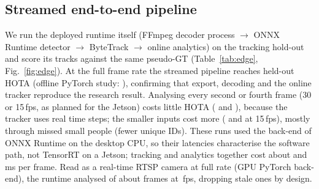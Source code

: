\documentclass[conference]{IEEEtran}
\begin{document}
\subsection{Streamed end-to-end pipeline}
We run the deployed runtime itself (FFmpeg decoder process $\rightarrow$ ONNX Runtime detector $\rightarrow$
ByteTrack $\rightarrow$ online analytics) on the tracking hold-out and score its tracks against the same
pseudo-GT (Table~\ref{tab:edge}, Fig.~\ref{fig:edge}). At the full frame rate the streamed pipeline reaches
held-out HOTA \EdHotaHiSOne{} (offline PyTorch study: \EdRefHota), confirming that export,
decoding and the online tracker reproduce the research result. Analysing every second or fourth frame (30 or
15\,fps, as planned for the Jetson) costs little HOTA (\EdHotaHiSTwo{} and \EdHotaHiSFour), because the tracker
uses real time steps; the smaller inputs cost more (\EdHotaMidSFour{} and \EdHotaLoSFour{} at 15\,fps),
mostly through missed small people (fewer unique IDs). These runs used the \texttt{\EdProvider} back-end of ONNX
Runtime on the desktop CPU, so their latencies characterise the software path, not TensorRT on a Jetson;
tracking and analytics together cost about \EdTrkMsHiSOne{} and \EdAnaMsHiSOne\,ms per frame.
\ifHaveEdgeLive
Read as a real-time RTSP camera at full rate (GPU PyTorch back-end), the runtime analysed
\EdLiveFrames{} of about \EdLivePublished{} frames at \EdLiveFps\,fps, dropping stale ones by design.
\fi
\end{document}
